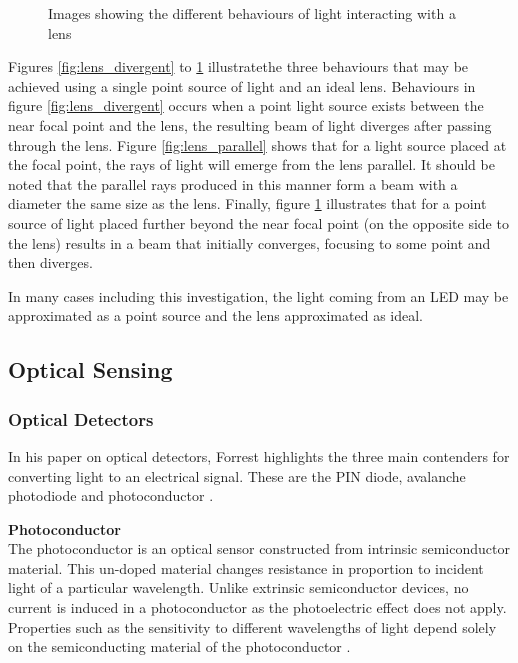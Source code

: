 \begin{figure}[H]
\begin{minipage}{.3\textwidth}
		\label{fig:lens_convergent}
	\end{minipage}
	\caption*{Images showing the different behaviours of light interacting with a lens}
\end{figure}

Figures \ref{fig:lens_divergent} to \ref{fig:lens_convergent} illustrate\footnotemark the three behaviours that may be achieved using a single point source of light and an ideal lens. Behaviours in figure \ref{fig:lens_divergent} occurs when a point light source exists between the near focal point and the lens, the resulting beam of light diverges after passing through the lens. Figure \ref{fig:lens_parallel} shows that for a light source placed at the focal point, the rays of light will emerge from the lens parallel. It should be noted that the parallel rays produced in this manner form a beam with a diameter the same size as the lens. Finally, figure \ref{fig:lens_convergent} illustrates that for a point source of light placed further beyond the near focal point (on the opposite side to the lens) results in a beam that initially converges, focusing to some point and then diverges.

In many cases including this investigation, the light coming from an LED may be approximated as a point source and the lens approximated as ideal.



\subsection{Optical Sensing}
\label{sec:optical_sensing}

\subsubsection{Optical Detectors}
In his paper on optical detectors, Forrest highlights the three main contenders for converting light to an electrical signal. These are the PIN diode, avalanche photodiode and photoconductor \cite{Forrest1986}.

\textbf{Photoconductor}\\
The photoconductor is an optical sensor constructed from intrinsic semiconductor material. This un-doped material changes resistance in proportion to incident light of a particular wavelength. Unlike extrinsic semiconductor devices, no current is induced in a photoconductor as the photoelectric effect does not apply. Properties such as the sensitivity to different wavelengths of light depend solely on the semiconducting material of the photoconductor \cite{Kingston2003}.

